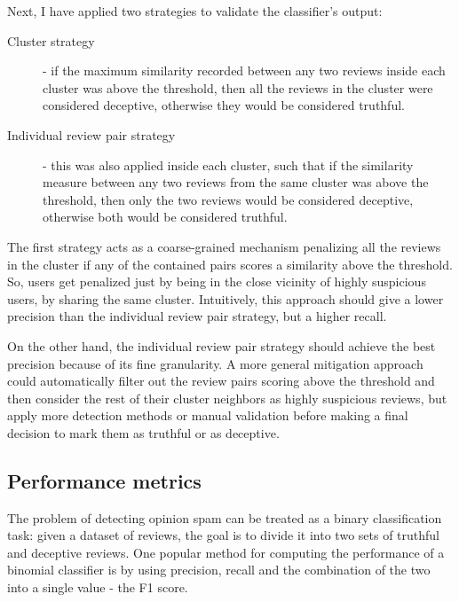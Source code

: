 Next, I have applied two strategies to validate the classifier's output:
\begin{description}
\item[Cluster strategy] - if the maximum similarity recorded between any two reviews inside each cluster was above the threshold, then all the reviews in the cluster were considered deceptive, otherwise they would be considered truthful.
\item[Individual review pair strategy] - this was also applied inside each cluster, such that if the similarity measure between any two reviews from the same cluster was above the threshold, then only the two reviews would be considered deceptive, otherwise both would be considered truthful.
\end{description}

The first strategy acts as a coarse-grained mechanism penalizing all the reviews in the cluster if any of the contained pairs scores a similarity above the threshold. So, users get penalized just by being in the close vicinity of highly suspicious users, by sharing the same cluster. Intuitively, this approach should give a lower precision than the individual review pair strategy, but a higher recall. 

On the other hand, the individual review pair strategy should achieve the best precision because of its fine granularity. A more general mitigation approach could automatically filter out the review pairs scoring above the threshold and then consider the rest of their cluster neighbors as highly suspicious reviews, but apply more detection methods or manual validation before making a final decision to mark them as truthful or as deceptive. 

\subsection{Performance metrics}

The problem of detecting opinion spam can be treated as a binary classification task: given a dataset of reviews, the goal is to divide it into two sets of truthful and deceptive reviews. One popular method for computing the performance of a binomial classifier is by using precision, recall and the combination of the two into a single value - the F1 score.


